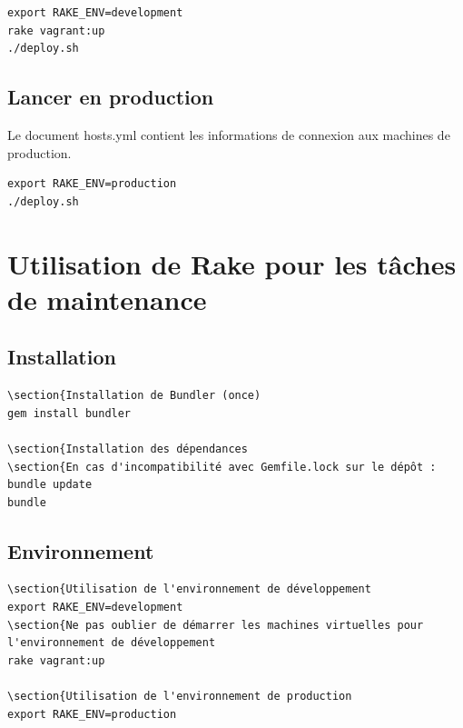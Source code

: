 \documentclass[a4paper,oneside,10pt]{article}
\begin{document}
\begin{verbatim}
export RAKE_ENV=development
rake vagrant:up
./deploy.sh
\end{verbatim}

\subsection{Lancer en production}

Le document hosts.yml contient les informations de connexion aux machines de production. 

\begin{verbatim}
export RAKE_ENV=production
./deploy.sh
\end{verbatim}


\section{Utilisation de Rake pour les tâches de maintenance}

\subsection{Installation}

\begin{verbatim}
\section{Installation de Bundler (once)
gem install bundler

\section{Installation des dépendances
\section{En cas d'incompatibilité avec Gemfile.lock sur le dépôt : bundle update
bundle
\end{verbatim}

\subsection{Environnement}

\begin{verbatim}
\section{Utilisation de l'environnement de développement
export RAKE_ENV=development
\section{Ne pas oublier de démarrer les machines virtuelles pour l'environnement de développement
rake vagrant:up

\section{Utilisation de l'environnement de production
export RAKE_ENV=production
\end{verbatim}
\end{document}
